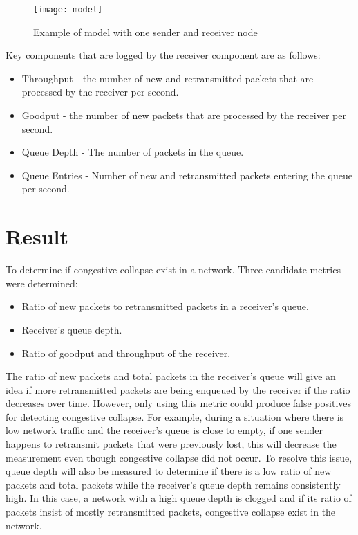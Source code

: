\documentclass{article}
\begin{document}
\begin{figure}[H]
	\texttt{[image: model]}
	\centering
	\caption{Example of model with one sender and receiver node}
\end{figure}

Key components that are logged by the receiver component are as follows:

\begin{itemize}
	\item Throughput - the number of new and retransmitted packets that are processed by the receiver per second.
	\item Goodput - the number of new packets that are processed by the receiver per second.
	\item Queue Depth - The number of packets in the queue.
	\item Queue Entries - Number of new and retransmitted packets entering the queue per second.
\end{itemize}


\section{Result} %

To determine if congestive collapse exist in a network. Three candidate metrics were determined:

\begin{itemize}
	\item Ratio of new packets to retransmitted packets in a receiver's queue.
	\item Receiver's queue depth.
	\item Ratio of goodput and throughput of the receiver.
\end{itemize}

The ratio of new packets and total packets in the receiver's queue will give an idea if more retransmitted packets are being enqueued by the receiver if the ratio decreases over time. However, only using this metric could produce false positives for detecting congestive collapse. For example, during a situation where there is low network traffic and the receiver's queue is close to empty, if one sender happens to retransmit packets that were previously lost, this will decrease the measurement even though congestive collapse did not occur.
To resolve this issue, queue depth will also be measured to determine if there is a low ratio of new packets and total packets while the receiver's queue depth remains consistently high. In this case, a network with a high queue depth is clogged and if its ratio of packets insist of mostly retransmitted packets, congestive collapse exist in the network.
\end{document}
